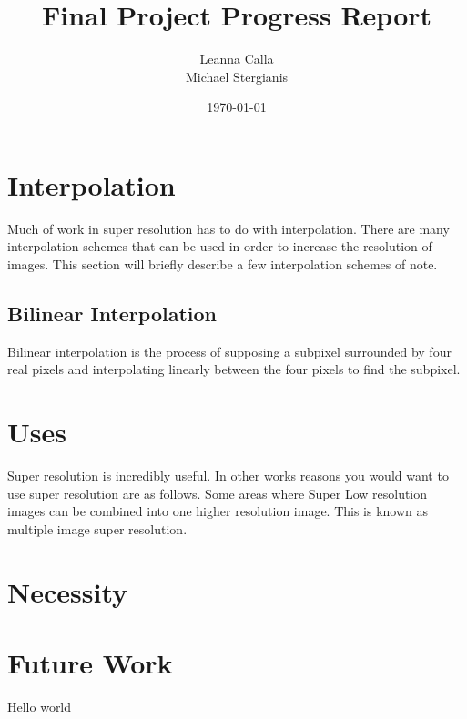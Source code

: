 \documentclass{article}
\title{Final Project Progress Report}
\author{Leanna Calla\\Michael Stergianis}
\date{\today}
\begin{document}
\maketitle
\section{Interpolation}
\label{sec:interpolation}
Much of work in super resolution has to do with interpolation.  There
are many interpolation schemes that can be used in order to increase
the resolution of images. This section will briefly describe a few
interpolation schemes of note.
%
\subsection{Bilinear Interpolation}
\label{subsec:bilinear}
Bilinear interpolation is the process of supposing a subpixel
surrounded by four real pixels and interpolating linearly between the
four pixels to find the subpixel.
%
%
\section{Uses}
\label{sec:uses}
Super resolution is incredibly useful. In other works \cite{Yang2010ImageSH} reasons you
would want to use super resolution are as follows. Some areas where
Super 
%
Low resolution images can be combined into one higher resolution
image. This is known as multiple image super resolution.
%
%
\section{Necessity}
\label{sec:necessity}
%
%
\section{Future Work}
\label{sec:future}
Hello world
%
\printbibliography
\end{document}
